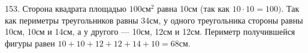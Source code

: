 153. Сторона квадрата площадью $100\text{см}^2$ равна 10см (так как $10\cdot10=100).$ Так как периметры треугольников равны 34см, у одного треугольника стороны равны 10см, 10см и 14см, а у другого --- 10см, 12см и 12см. Периметр получившейся фигуры равен $10+10+12+12+14+10=68$см.\\

